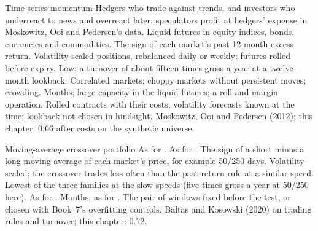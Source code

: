 \begin{strategyfile}{Time-series momentum}\label{strat:s1:trend-following:tsmom}
 Hedgers who trade against trends, and investors who underreact to news and overreact later; speculators profit at hedgers'
expense in Moskowitz, Ooi and Pedersen's data.
 Liquid futures in equity indices, bonds, currencies and commodities.
 The sign of each market's past 12-month excess return.
 Volatility-scaled positions, rebalanced daily or weekly; futures rolled before expiry.
 Low: a turnover of about fifteen times gross a year at a twelve-month lookback.
 Correlated markets; choppy markets without persistent moves; crowding.
 Months; large capacity in the liquid futures; a roll and margin operation.
 Rolled contracts with their costs; volatility forecasts known at the time; lookback not chosen in hindsight.
 Moskowitz, Ooi and Pedersen (2012); this chapter: 0.66 after costs on the synthetic universe.
\end{strategyfile}

\begin{strategyfile}{Moving-average crossover portfolio}\label{strat:s1:trend-following:ma}
 As for .
 As for .
 The sign of a short minus a long moving average of each market's price, for example 50/250 days.
 Volatility-scaled; the crossover trades less often than the past-return rule at a similar speed.
 Lowest of the three families at the slow speeds (five times gross a year at 50/250 here).
 As for .
 Months; as for .
 The pair of windows fixed before the test, or chosen with Book~7's overfitting controls.
 Baltas and Kosowski (2020) on trading rules and turnover; this chapter: 0.72.
\end{strategyfile}

